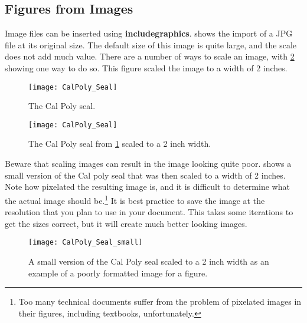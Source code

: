 \subsection{Figures from Images} \label{sec:FiguresFromImages}
    Image files can be inserted using \textbf{includegraphics}.
     shows the import of a JPG file at its original size.
    The default size of this image is quite large, and the scale does not add much value.
    There are a number of ways to scale an image, with \cref{fig:CalPolySeal_small} showing one way to do so.
    This figure scaled the image to a width of 2 inches.
    \makeatletter
    \@currsize
    \makeatother
    \begin{figure}
        \centering
        \texttt{[image: CalPoly\_Seal]}
        \caption{The Cal Poly seal.}
        \label{fig:CalPolySeal1}
    \end{figure}
    \begin{figure}
        \centering
        \texttt{[image: CalPoly\_Seal]}
        \caption{The Cal Poly seal from \cref{fig:CalPolySeal1} scaled to a 2 inch width.}
        \label{fig:CalPolySeal_small}
    \end{figure}

    Beware that scaling images can result in the image looking quite poor.
     shows a small version of the Cal poly seal that was then scaled to a width of 2 inches.
    Note how pixelated the resulting image is, and it is difficult to determine what the actual image should be.\footnote{Too many technical documents suffer from the problem of pixelated images in their figures, including textbooks, unfortunately.}
    It is best practice to save the image at the resolution that you plan to use in your document.
    This takes some iterations to get the sizes correct, but it will create much better looking images.
    \begin{figure}
        \centering
        \texttt{[image: CalPoly\_Seal\_small]}
        \caption{A small version of the Cal Poly seal scaled to a 2 inch width as an example of a poorly formatted image for a figure.}
        \label{fig:CalPolySeal_scaled}
    \end{figure}

